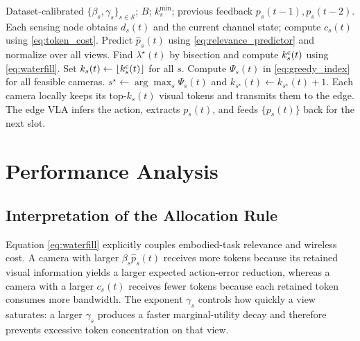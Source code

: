\documentclass[lettersize,journal]{IEEEtran}
\theoremstyle{custom}
\begin{document}
\begin{algorithm}[t]
\caption{Dataset-Calibrated Delayed Action-Relevance-Aware Token Allocation}\label{alg:allocation}
\begin{algorithmic}[1]
\REQUIRE Dataset-calibrated $\{\beta_s,\gamma_s\}_{s\in\mathcal S}$; $B$; $k_s^{\min}$; previous feedback $p_s(t-1),p_s(t-2)$.
\STATE Each sensing node obtains $d_s(t)$ and the current channel state; compute $c_s(t)$ using \eqref{eq:token_cost}.
\STATE Predict $\widehat p_s(t)$ using \eqref{eq:relevance_predictor} and normalize over all views.
\STATE Find $\lambda^\star(t)$ by bisection and compute $k_s^{\rm c}(t)$ using \eqref{eq:waterfill}.
\STATE Set $k_s(t)\leftarrow\lfloor k_s^{\rm c}(t)\rfloor$ for all $s$.
    \STATE Compute $\Psi_s(t)$ in \eqref{eq:greedy_index} for all feasible cameras.
    \STATE $s^\star\leftarrow\arg\max_s\Psi_s(t)$ and $k_{s^\star}(t)\leftarrow k_{s^\star}(t)+1$.
\ENDWHILE
\STATE Each camera locally keeps its top-$k_s(t)$ visual tokens and transmits them to the edge.
\STATE The edge VLA infers the action, extracts $p_s(t)$, and feeds $\{p_s(t)\}$ back for the next slot.
\end{algorithmic}
\end{algorithm}

\section{Performance Analysis}
\subsection{Interpretation of the Allocation Rule}
Equation \eqref{eq:waterfill} explicitly couples embodied-task relevance and wireless cost. A camera with larger $\beta_s\widehat p_s(t)$ receives more tokens because its retained visual information yields a larger expected action-error reduction, whereas a camera with a larger $c_s(t)$ receives fewer tokens because each retained token consumes more bandwidth. The exponent $\gamma_s$ controls how quickly a view saturates: a larger $\gamma_s$ produces a faster marginal-utility decay and therefore prevents excessive token concentration on that view.
\end{document}
